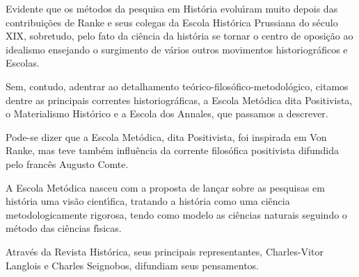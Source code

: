 \documentclass[
12pt,		%
openright,	%
twoside,  %
a4paper,			%
chapter=TITLE,		%
english,			%
french,				%
spanish,			%
brazil				%
]{USPSC-classe/USPSC_RedarTex}
\begin{document}
Evidente que os m\'etodos da pesquisa em Hist\'oria evolu\'{\i}ram muito depois das contribui\c{c}\~oes de Ranke e seus colegas da Escola Hist\'orica Prussiana do s\'eculo XIX, sobretudo, pelo fato da ci\^encia  da hist\'oria se tornar o centro de oposi\c{c}\~ao ao idealismo ensejando o surgimento de v\'arios outros movimentos historiogr\'aficos e Escolas.








Sem, contudo, adentrar ao detalhamento te\'orico-filos\'ofico-metodol\'ogico, citamos dentre as principais correntes historiogr\'aficas, a Escola Met\'odica dita Positivista, o Materialismo Hist\'orico e a Escola dos Annales, que passamos a descrever.








Pode-se dizer que a Escola Met\'odica, dita Positivista, foi inspirada em Von Ranke, mas teve tamb\'em influ\^encia da corrente filos\'ofica positivista difundida pelo franc\^es Augusto Comte.








A Escola Met\'odica nasceu com a proposta de  lan\c{c}ar sobre as pesquisas em hist\'oria uma vis\~ao cient\'{\i}fica, tratando a hist\'oria como uma ci\^encia metodologicamente rigorosa, tendo como modelo as ci\^encias naturais seguindo o m\'etodo das ci\^encias f\'{\i}sicas.








Atrav\'es da Revista Hist\'orica, seus principais representantes, Charles-Vitor Langlois e Charles Seignobos, difundiam seus pensamentos.









\noindent\begin{center}\mbox{\centering{}}\end{center}
\end{document}
